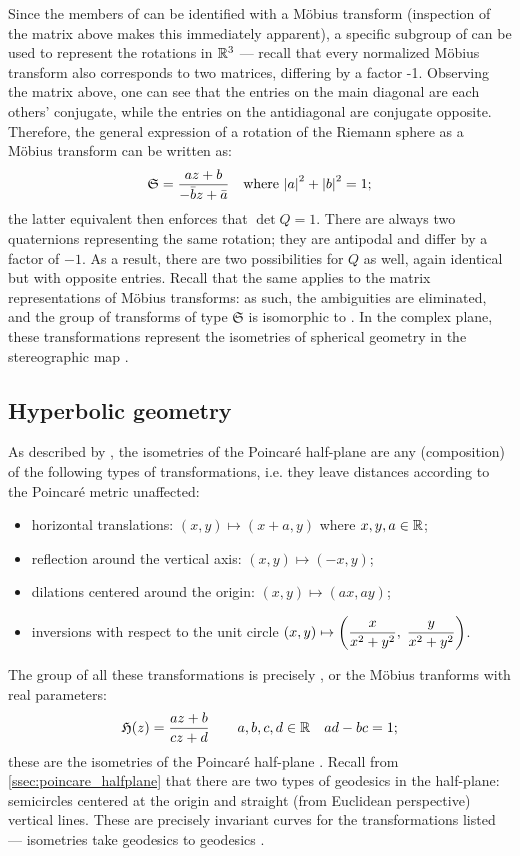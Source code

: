 Since the members of  can be identified with a Möbius transform (inspection of the matrix above makes this immediately apparent), a specific subgroup of \moebiusgroup can be used to represent the rotations in \(\mathbb{R}^3\) --- recall that every normalized Möbius transform also corresponds to two matrices, differing by a factor -1. Observing the matrix above, one can see that the entries on the main diagonal are each others' conjugate, while the entries on the antidiagonal are conjugate opposite. Therefore, the general expression of a rotation of the Riemann sphere as a Möbius transform can be written as: \cite{Needham2021}
\[\mathfrak{S} = \frac{az + b}{-\bar{b}z+\bar{a}}\quad\text{where } \abs{a}^2 + \abs{b}^2 = 1; \]
the latter equivalent then enforces that \(\det Q = 1\). There are always two quaternions representing the same rotation; they are antipodal and differ by a factor of \(-1\). As a result, there are two possibilities for \(Q\) as well, again identical but with opposite entries. Recall that the same applies to the matrix representations of Möbius transforms: as such, the ambiguities are eliminated, and the group of transforms of type \(\mathfrak{S}\) is isomorphic to \sogroup. In the complex plane, these transformations represent the isometries of spherical geometry in the stereographic map \cite{Needham1997}. 


\subsection{Hyperbolic geometry}
As described by \citet{Rovenski2010}, the isometries of the Poincaré half-plane are any (composition) of the following types of transformations, i.e. they leave distances according to the Poincaré metric unaffected:
\begin{itemize}
    \item horizontal translations: \((x, y)\mapsto(x + a, y)\) where \(x, y, a \in \mathbb{R}\);
    \item reflection around the vertical axis: \((x, y) \mapsto (-x, y)\);
    \item dilations centered around the origin: \((x, y) \mapsto (ax, ay)\);
    \item inversions with respect to the unit circle \(\displaystyle (x, y)\mapsto\qty(\frac{x}{x^2 + y^2},\;\frac{y}{x^2 + y^2})\).
\end{itemize}
The group of all these transformations is precisely , or the Möbius tranforms with real parameters:
\[\mathfrak{H}(z) = \frac{az + b}{cz + d}\qquad a, b, c, d \in \mathbb{R} \quad ad - bc = 1;\]
these are the isometries of the Poincaré half-plane \cite{Needham2021}. Recall from \cref{ssec:poincare_halfplane} that there are two types of geodesics in the half-plane: semicircles centered at the origin and straight (from Euclidean perspective) vertical lines. These are precisely invariant curves for the transformations listed --- isometries take geodesics to geodesics \cite{Lee1997}.

